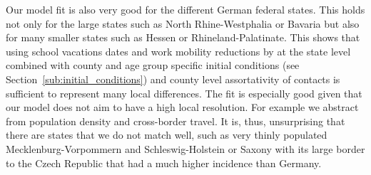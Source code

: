 \FloatBarrier

Our model fit is also very good for the different German federal states. This holds not
only for the large states such as North Rhine-Westphalia or Bavaria but also for many
smaller states such as Hessen or Rhineland-Palatinate. This shows that using school
vacations dates and work mobility reductions by \cite{Google2021} at the state level
combined with county and age group specific initial conditions (see
Section~\ref{sub:initial_conditions}) and county level assortativity of contacts is
sufficient to represent many local differences.  %
The fit is especially good given that our model does not aim to have a high local
resolution. For example we abstract from population density and cross-border travel. It
is, thus, unsurprising that there are states that we do not match well, such as very
thinly populated Mecklenburg-Vorpommern and Schleswig-Holstein or Saxony with its large
border to the Czech Republic that had a much higher incidence than
Germany.

